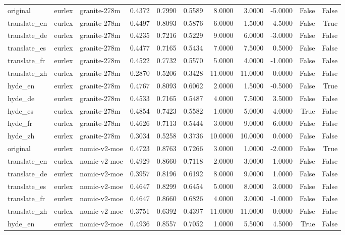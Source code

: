 \begin{tabular}{lllrrrrrrrr}
original & eurlex & granite-278m & 0.4372 & 0.7990 & 0.5589 & 8.0000 & 3.0000 & -5.0000 & False & False \\
translate\_en & eurlex & granite-278m & 0.4497 & 0.8093 & 0.5876 & 6.0000 & 1.5000 & -4.5000 & False & True \\
translate\_de & eurlex & granite-278m & 0.4235 & 0.7216 & 0.5229 & 9.0000 & 6.0000 & -3.0000 & False & False \\
translate\_es & eurlex & granite-278m & 0.4477 & 0.7165 & 0.5434 & 7.0000 & 7.5000 & 0.5000 & False & False \\
translate\_fr & eurlex & granite-278m & 0.4522 & 0.7732 & 0.5570 & 5.0000 & 4.0000 & -1.0000 & False & False \\
translate\_zh & eurlex & granite-278m & 0.2870 & 0.5206 & 0.3428 & 11.0000 & 11.0000 & 0.0000 & False & False \\
hyde\_en & eurlex & granite-278m & 0.4767 & 0.8093 & 0.6062 & 2.0000 & 1.5000 & -0.5000 & False & True \\
hyde\_de & eurlex & granite-278m & 0.4533 & 0.7165 & 0.5487 & 4.0000 & 7.5000 & 3.5000 & False & False \\
hyde\_es & eurlex & granite-278m & 0.4854 & 0.7423 & 0.5582 & 1.0000 & 5.0000 & 4.0000 & True & False \\
hyde\_fr & eurlex & granite-278m & 0.4626 & 0.7113 & 0.5444 & 3.0000 & 9.0000 & 6.0000 & False & False \\
hyde\_zh & eurlex & granite-278m & 0.3034 & 0.5258 & 0.3736 & 10.0000 & 10.0000 & 0.0000 & False & False \\
original & eurlex & nomic-v2-moe & 0.4723 & 0.8763 & 0.7266 & 3.0000 & 1.0000 & -2.0000 & False & True \\
translate\_en & eurlex & nomic-v2-moe & 0.4929 & 0.8660 & 0.7118 & 2.0000 & 3.0000 & 1.0000 & False & False \\
translate\_de & eurlex & nomic-v2-moe & 0.3957 & 0.8196 & 0.6192 & 8.0000 & 9.0000 & 1.0000 & False & False \\
translate\_es & eurlex & nomic-v2-moe & 0.4647 & 0.8299 & 0.6454 & 5.0000 & 8.0000 & 3.0000 & False & False \\
translate\_fr & eurlex & nomic-v2-moe & 0.4647 & 0.8660 & 0.6826 & 4.0000 & 3.0000 & -1.0000 & False & False \\
translate\_zh & eurlex & nomic-v2-moe & 0.3751 & 0.6392 & 0.4397 & 11.0000 & 11.0000 & 0.0000 & False & False \\
hyde\_en & eurlex & nomic-v2-moe & 0.4936 & 0.8557 & 0.7052 & 1.0000 & 5.5000 & 4.5000 & True & False \\

\end{tabular}
